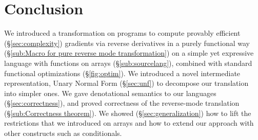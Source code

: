 \section{Conclusion}
\label{sec:conclusion}

We introduced a transformation on programs to compute provably efficient (\S\ref{sec:complexity}) 
gradients via reverse derivatives in a purely functional way (\S\ref{sub:Macro for pure reverse mode transformation})
on a simple yet expressive language with functions on arrays (\S\ref{sub:sourcelang}), 
combined with standard functional optimizations (\S\ref{fig:optim}).  
We introduced a novel intermediate representation, Unary Normal Form (\S\ref{sec:unf}) 
to decompose our translation into simpler ones.
We gave denotational semantics to our languages (\S\ref{sec:correctness}), 
and proved correctness of the reverse-mode translation (\S\ref{sub:Correctness theorem}).
We showed (\S\ref{sec:generalization}) how to lift the restrictions that
we introduced on arrays and how to extend our approach with other constructs such as conditionals.
\clearpage